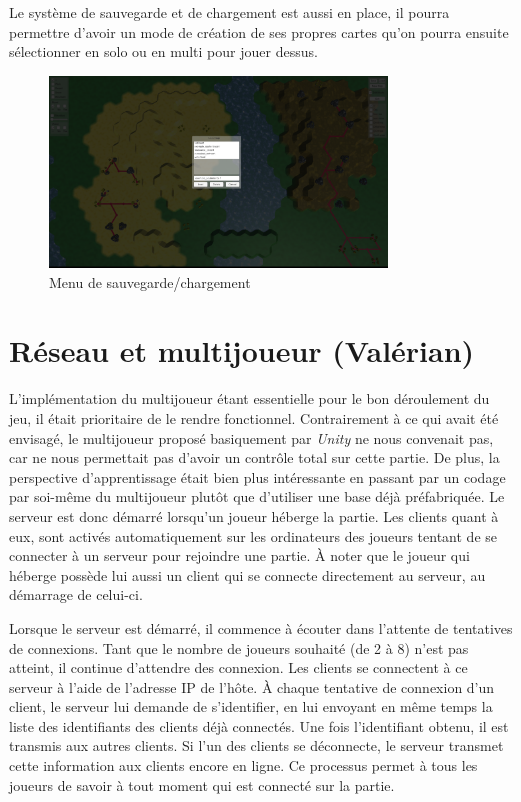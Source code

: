 \documentclass[12pt]{report}
\begin{document}
\newpage

Le système de sauvegarde et de chargement est aussi en place, il pourra permettre d’avoir un mode de création de ses propres cartes qu’on pourra ensuite sélectionner en solo ou en multi pour jouer dessus.

\begin{figure}[H]
    \centering
    \includegraphics[width=0.8\textwidth]{map_save_load}
    \caption{Menu de sauvegarde/chargement}
\end{figure}

\section{Réseau et multijoueur (Valérian)}

L’implémentation du multijoueur étant essentielle pour le bon déroulement du jeu, il était prioritaire de le rendre fonctionnel. Contrairement à ce qui avait été envisagé, le multijoueur proposé basiquement par \textit{Unity} ne nous convenait pas, car ne nous permettait pas d’avoir un contrôle total sur cette partie. De plus, la perspective d’apprentissage était bien plus intéressante en passant par un codage par soi-même du multijoueur plutôt que d’utiliser une base déjà préfabriquée. Le serveur est donc démarré lorsqu’un joueur héberge la partie. Les clients quant à eux, sont activés automatiquement sur les ordinateurs des joueurs tentant de se connecter à un serveur pour rejoindre une partie. À noter que le joueur qui héberge possède lui aussi un client qui se connecte directement au serveur, au démarrage de celui-ci.

Lorsque le serveur est démarré, il commence à écouter dans l’attente de tentatives de connexions. Tant que le nombre de joueurs souhaité (de 2 à 8) n’est pas atteint, il continue d’attendre des connexion. Les clients se connectent à ce serveur à l’aide de l’adresse IP de l’hôte. À chaque tentative de connexion d’un client, le serveur lui demande de s’identifier, en lui envoyant en même temps la liste des identifiants des clients déjà connectés. Une fois l’identifiant obtenu, il est transmis aux autres clients. Si l’un des clients se déconnecte, le serveur transmet cette information aux clients encore en ligne. Ce processus permet à tous les joueurs de savoir à tout moment qui est connecté sur la partie.
\end{document}
